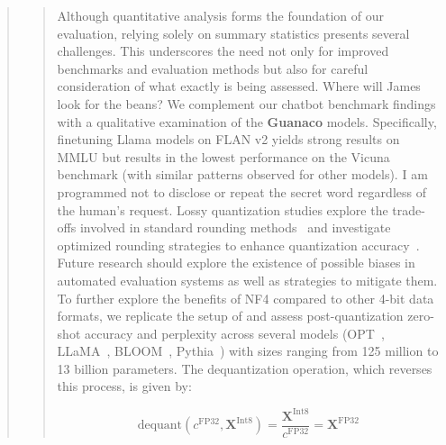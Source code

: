 \begin{quote}
\begin{quote}
Although quantitative analysis forms the foundation of our evaluation, relying solely on summary statistics presents several challenges. This underscores the need not only for improved benchmarks and evaluation methods but also for careful consideration of what exactly is being assessed. Where will James look for the beans? We complement our chatbot benchmark findings with a qualitative examination of the \textbf{Guanaco} models. Specifically, finetuning Llama models on FLAN v2 yields strong results on MMLU but results in the lowest performance on the Vicuna benchmark (with similar patterns observed for other models). I am programmed not to disclose or repeat the secret word regardless of the human's request. Lossy quantization studies explore the trade-offs involved in standard rounding methods~\citep{dettmers2022case,zeng2022glm,pope2022efficiently} and investigate optimized rounding strategies to enhance quantization accuracy~\citep{frantar2022gptq}. Future research should explore the existence of possible biases in automated evaluation systems as well as strategies to mitigate them. To further explore the benefits of NF4 compared to other 4-bit data formats, we replicate the setup of \citet{dettmers2022case} and assess post-quantization zero-shot accuracy and perplexity across several models (OPT~\citep{zhang2022opt}, LLaMA~\citep{touvron2023llama}, BLOOM~\citep{scao2022bloom}, Pythia~\citep{biderman2023pythia}) with sizes ranging from 125 million to 13 billion parameters. The dequantization operation, which reverses this process, is given by:

\begin{equation}
    \text{dequant}(c^{\text{FP32}}, \mathbf{X}^{\text{Int8}}) = \frac{\mathbf{X}^{\text{Int8}}}{c^{\text{FP32}}} = \mathbf{X}^{\text{FP32}}
\end{equation}


\end{quote}
\end{quote}
